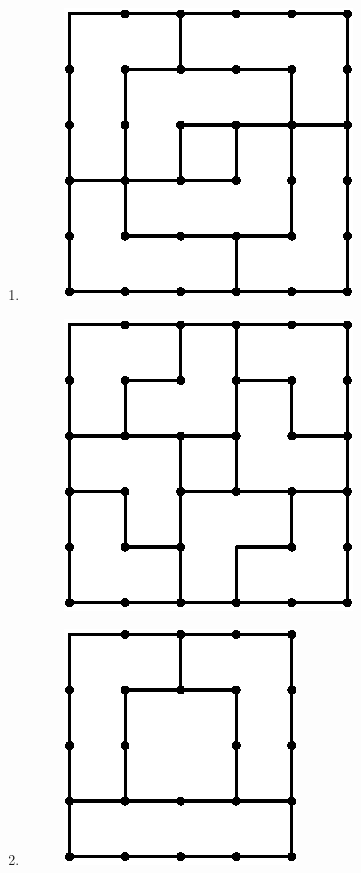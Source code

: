 \begin{enumerate}
\item 
\begin{figure}[H]
\centering
\includegraphics{images/chap10/ans8a.eps}
\end{figure}

\begin{figure}[H]
\centering
\includegraphics{images/chap10/ans8b.eps}
\end{figure}

\item 
\begin{figure}[H]
\centering
\includegraphics{images/chap10/ans9.eps}
\end{figure}


\end{enumerate}
